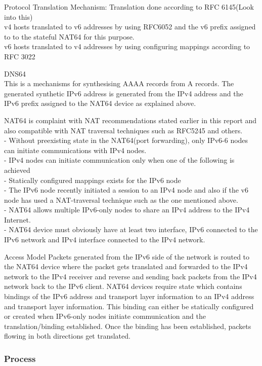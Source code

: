 \documentclass[iwp,first]{luthesis}
\begin{document}
Protocol Translation Mechanism: Translation done according to RFC 6145(Look into this)
\\v4 hosts translated to v6 addresses by using RFC6052 and the v6 prefix assigned to to the stateful NAT64 for this purpose.
\\v6 hosts translated to v4 addresses by using configuring mappings according to RFC 3022


DNS64
\\This is a mechanisms for synthesising AAAA records from A records. The generated synthetic IPv6 address is generated from the IPv4 address and the IPv6 prefix assigned to the NAT64 device as explained above.


NAT64 is complaint with NAT recommendations stated earlier in this report and also compatible with NAT traversal techniques such as RFC5245 and others.
\\- Without preexisting state in the NAT64(port forwarding), only IPv6-6 nodes can initiate communications with IPv4 nodes.
\\- IPv4 nodes can initiate communication only when one of the following is achieved
\\- Statically configured mappings exists for the IPv6 node
\\- The IPv6 node recently initiated a session to an IPv4 node and also if the v6 node has used a NAT-traversal technique such as the one
mentioned above.
\\- NAT64 allows multiple IPv6-only nodes to share an IPv4 address to the IPv4 Internet.
\\- NAT64 device must obviously have at least two interface, IPv6 connected to the IPv6 network and IPv4 interface connected to the IPv4 network.


Access Model
Packets generated from the IPv6 side of the network is routed to the NAT64 device where the packet gets translated and forwarded to the IPv4 network to the IPv4 receiver and reverse and sending back packets from the IPv4 network back to the IPv6 client. NAT64 devices require state which contains bindings of the IPv6 address and transport layer information to an IPv4 address and transport layer information. This binding can either be statically configured or created when IPv6-only nodes initiate communication and the translation/binding established. Once the binding has been established, packets flowing in both directions get translated.

\subsubsection {Process}
\end{document}
